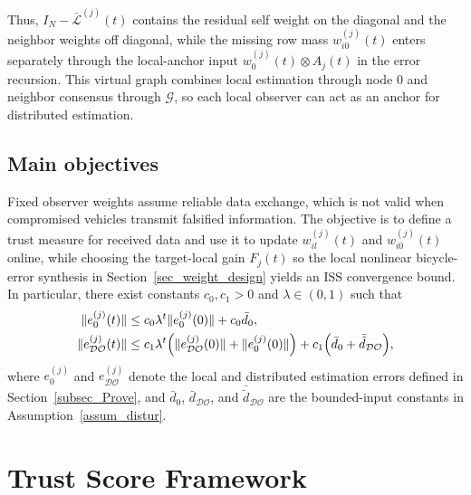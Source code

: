 \documentclass[letterpaper,journal]{IEEEtran}
\def\G{\mathcal{G}} %
\def\L{\mathcal{L}} %
\def\DO{\mathcal{DO}} %
\begin{document}
    Thus, $I_N-\bar{\L}^{(j)}(t)$ contains the residual self weight on the diagonal and the neighbor weights off diagonal, while the missing row mass $w_{i0}^{(j)}(t)$ enters separately through the local-anchor input $w_0^{(j)}(t)\otimes A_j(t)$ in the error recursion. This virtual graph combines local estimation through node $0$ and neighbor consensus through $\G$, so each local observer can act as an anchor for distributed estimation.

\subsection{Main objectives}
Fixed observer weights assume reliable data exchange, which is not valid when compromised vehicles transmit falsified information. The objective is to define a trust measure for received data and use it to update $w_{il}^{(j)}(t)$ and $w_{i0}^{(j)}(t)$ online, while choosing the target-local gain $F_j(t)$ so the local nonlinear bicycle-error synthesis in Section~\ref{sec_weight_design} yields an ISS convergence bound. In particular, there exist constants $c_0, c_1 > 0$ and $\lambda \in (0,1)$ such that
\begin{align}
\|e_0^{(j)}(t)\| &\le c_0\lambda^t \|e_0^{(j)}(0)\| + c_0 \bar{d}_0,\label{eq_iss_e0}\\
\|e_{\DO}^{(j)}(t)\| &\le c_1\lambda^t
\Big(\|e_{\DO}^{(j)}(0)\|+\|e_0^{(j)}(0)\|\Big)\notag
+c_1\Big(\bar d_0+\bar{\tilde d}_{\DO}\Big),\label{eq_iss_edo}
\end{align}
where $e_0^{(j)}$ and $e_{\DO}^{(j)}$ denote the local and distributed estimation errors defined in Section~\ref{subsec_Prove}, and $\bar{d}_0$, $\bar{d}_{\DO}$, and $\bar{\tilde{d}}_{\DO}$ are the bounded-input constants in Assumption~\ref{assum_distur}.


\section{Trust Score Framework}\label{sec_trust_score}
\end{document}
